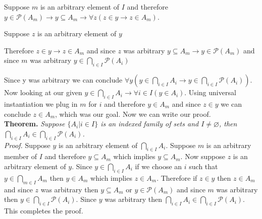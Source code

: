 \documentclass{article}
\newcommand{\n}{ \noindent }
\newcommand{\pwset}{\mathscr{P}}
\begin{document}
\begin{addmargin}[0.55cm]{0cm}
Suppose $m$ is an arbitrary element of $I$ and therefore $y \in \pwset(A_m) \rightarrow y \subseteq A_m \rightarrow \forall z (z \in y \rightarrow z \in A_m)$.
\end{addmargin}

\indent \indent Suppose $z$ is an arbitrary element of $y$ \\
\indent \indent \indent [proof of $z \in A_m$] 
\begin{addmargin}[0.55cm]{0cm}
Therefore $z \in y \rightarrow z \in A_m$ and since $z$ was arbitrary $y \subseteq A_m \rightarrow y \in \pwset(A_m)$ and since $m$ was arbitrary $y \in \bigcap_{i \in I} \pwset(A_i)$
\end{addmargin}
\n Since y was arbitrary we can conclude $\forall y (y \in \bigcap_{i \in I} A_i \rightarrow y \in \bigcap_{i \in I} \pwset(A_i))$. \\

\n Now looking at our given $y \in \bigcap_{i \in I} A_i \rightarrow \forall i \in I(y \in A_i)$. Using universal instantiation we plug in $m$ for $i$ and therefore $y \in A_m$ and since $z \in y$ we can conclude $z \in A_m$, which was our goal. Now we can write our proof. \\

\n \textbf{Theorem.} \textit{Suppose $ \{ A_i | i \in I \}$ is an indexed family of sets and $ I \neq \varnothing$, then $\bigcap_{i \in I} A_i \in \bigcap_{i \in I} \pwset(A_i)$.} \\
\n \textit{Proof.} Suppose $y$ is an arbitrary element of $\bigcap_{i \in I} A_i$. Suppose $m$ is an arbitrary member of $I$ and therefore $y \subseteq A_m$ which implies $y \subseteq A_m$. Now suppose $z$ is an arbitrary element of $y$. Since $y \in \bigcap_{i \in I} A_i$ if we choose an $i$ such that $y \in \bigcap_{m \in I} A_m$ then $y \in A_m$ which implies $z \in A_m$. Therefore if $z \in y$ then $z \in A_m$ and since $z$ was arbitrary then $y \subseteq A_m$ or $y \in \pwset(A_m)$ and since $m$ was arbitrary then $y \in \bigcap_{i \in I} \pwset(A_i)$. Since $y$ was arbitrary then $\bigcap_{i \in I} A_i \in \bigcap_{i \in I} \pwset(A_i)$. This completes the proof.
\end{document}
